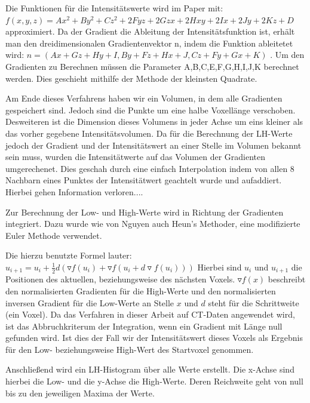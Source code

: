 Die Funktionen für die Intensitätswerte wird im Paper mit:  $f(x,y,z) = Ax^{2}+By^{2}+Cz^{2}+2Fyz+2Gzx+2Hxy+2Ix+2Jy+2Kz+D$  approximiert. Da der Gradient die Ableitung der Intensitätsfunktion ist, erhält man den dreidimensionalen Gradientenvektor n, indem die Funktion ableitetet wird: $n = (Ax+Gz+Hy+I, By+Fz+Hx+J, Cz + Fy + Gx + K)$ .
\newline
Um den Gradienten zu Berechnen müssen die Parameter A,B,C,E,F,G,H,I,J,K  berechnet werden. Dies geschieht mithilfe der Methode der kleinsten Quadrate.

Am Ende dieses Verfahrens haben wir ein Volumen, in dem alle Gradienten gespeichert sind. Jedoch sind die Punkte um eine halbe Voxellänge verschoben. Desweiteren ist die Dimension dieses Volumens in jeder Achse um eins kleiner als das vorher gegebene Intensitätsvolumen.
Da für die Berechnung der LH-Werte jedoch der Gradient und der Intensitätswert an einer Stelle im Volumen bekannt sein muss, wurden die Intensitätwerte auf das Volumen der Gradienten umgerechenet. Dies geschah durch eine einfach Interpolation indem von allen 8 Nachbarn eines Punktes der Intensitätwert geachtelt wurde und aufaddiert. Hierbei gehen Information verloren....


Zur Berechnung der Low- und High-Werte wird in Richtung der Gradienten integriert. Dazu wurde wie von Nguyen auch Heun's Methoder, eine modifizierte Euler Methode verwendet. 

Die hierzu benutzte Formel lauter: $u_{i+1} = u_{i} + \frac{1}{2}d(\triangledown f (u_{i}) + \triangledown f(u_{i}+d \triangledown f(u_{i}))) $
Hierbei sind $u_{i}$ und $u_{i+1}$ die Positionen des aktuellen, beziehungsweise des nächsten Voxels. $\triangledown f(x)$ beschreibt den normalisierten Gradienten für die High-Werte und den normalisierten inversen Gradient für die Low-Werte an Stelle $x$ und $d$ steht für die Schrittweite (ein Voxel).
Da das Verfahren in dieser Arbeit auf CT-Daten angewendet wird, ist das Abbruchkriterum der Integration, wenn ein Gradient mit Länge null gefunden wird. Ist dies der Fall wir der Intensitätswert dieses Voxels als Ergebnis für den Low- beziehungsweise High-Wert des Startvoxel genommen.



Anschließend wird ein LH-Histogram über alle Werte erstellt. Die x-Achse sind hierbei die Low- und die y-Achse die High-Werte. Deren Reichweite geht von null bis zu den jeweiligen Maxima der Werte.

